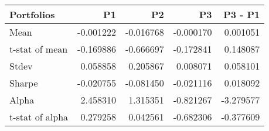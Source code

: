 \begin{tabular}{lrrrr}
\toprule
Portfolios & P1 & P2 & P3 & P3 - P1 \\
\midrule
Mean & -0.001222 & -0.016768 & -0.000170 & 0.001051 \\
t-stat of mean & -0.169886 & -0.666697 & -0.172841 & 0.148087 \\
Stdev & 0.058858 & 0.205867 & 0.008071 & 0.058101 \\
Sharpe & -0.020755 & -0.081450 & -0.021116 & 0.018092 \\
Alpha & 2.458310 & 1.315351 & -0.821267 & -3.279577 \\
t-stat of alpha & 0.279258 & 0.042561 & -0.682306 & -0.377609 \\
\bottomrule
\end{tabular}
